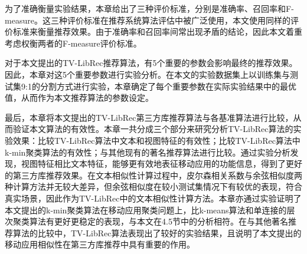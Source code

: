 为了准确衡量实验结果，本章给出了三种评价标准，分别是准确率、召回率和F-measure。这三种评价标准在推荐系统算法评估中被广泛使用，本文使用同样的评价标准来衡量推荐效果。由于准确率和召回率间常出现矛盾的结论，因此本文着重考虑权衡两者的F-measure评价标准。

对于本文提出的TV-LibRec推荐算法，有5个重要的参数会影响最终的推荐效果。因此，本章对这5个重要参数进行实验分析。在本文的实验数据集上以训练集与测试集9:1的分割方式进行实验，本章确定了每个重要参数在实际实验结果中的最优值，从而作为本文推荐算法的参数设定。

最后，本章将本文提出的TV-LibRec第三方库推荐算法与各基准算法进行比较，从而验证本文算法的有效性。本章一共分成三个部分来研究分析TV-LibRec算法的实验效果：比较TV-LibRec算法中文本和视图特征的有效性；比较TV-LibRec算法中k-min聚类算法的有效性；与其他现有的著名推荐算法进行比较。通过实验分析发现，视图特征相比文本特征，能够更有效地表征移动应用的功能信息，得到了更好的第三方库推荐效果。在文本相似性计算过程中，皮尔森相关系数与余弦相似度两种计算方法并无较大差异，但余弦相似度在较小测试集情况下有较优的表现，符合真实场景，因此作为TV-LibRec中的文本相似性计算方法。本章亦通过实验证明了本文提出的k-min聚类算法在移动应用聚类问题上，比k-means算法和单连接的层次聚类算法有更好更稳定的表现，与本文在4.5节中的分析相符。在与其他著名推荐算法的比较中，TV-LibRec算法表现出了较好的实验结果，且说明了本文提出的移动应用相似性在第三方库推荐中具有重要的作用。